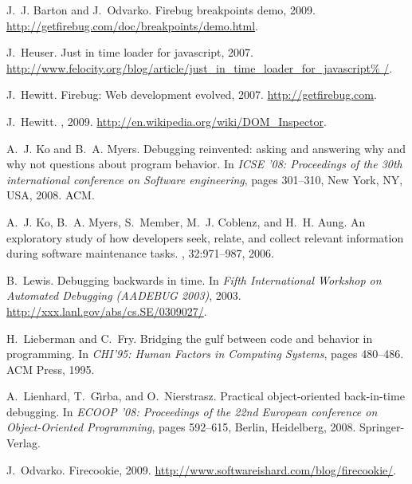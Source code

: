 \documentclass{www2010-accepted}
\begin{document}
\begin{thebibliography}{10}

J.~J. Barton and J.~Odvarko.
\newblock Firebug breakpoints demo, 2009.
\newblock \url{http://getfirebug.com/doc/breakpoints/demo.html}.

J.~Heuser.
\newblock Just in time loader for javascript, 2007.
\newblock
  \url{http://www.felocity.org/blog/article/just_in_time_loader_for_javascript%
/}.

J.~Hewitt.
\newblock Firebug: Web development evolved, 2007.
\newblock \url{http://getfirebug.com}.

J.~Hewitt.
, 2009.
\newblock \url{http://en.wikipedia.org/wiki/DOM_Inspector}.

A.~J. Ko and B.~A. Myers.
\newblock Debugging reinvented: asking and answering why and why not questions
  about program behavior.
\newblock In {\em ICSE '08: Proceedings of the 30th international conference on
  Software engineering}, pages 301--310, New York, NY, USA, 2008. ACM.

A.~J. Ko, B.~A. Myers, S.~Member, M.~J. Coblenz, and H.~H. Aung.
\newblock An exploratory study of how developers seek, relate, and collect
  relevant information during software maintenance tasks.
, 32:971--987, 2006.

B.~Lewis.
\newblock Debugging backwards in time.
\newblock In {\em Fifth International Workshop on Automated Debugging (AADEBUG
  2003)}, 2003.
\newblock \url{http://xxx.lanl.gov/abs/cs.SE/0309027/}.

H.~Lieberman and C.~Fry.
\newblock Bridging the gulf between code and behavior in programming.
\newblock In {\em CHI'95: Human Factors in Computing Systems}, pages 480--486.
  ACM Press, 1995.

A.~Lienhard, T.~G\^{\i}rba, and O.~Nierstrasz.
\newblock Practical object-oriented back-in-time debugging.
\newblock In {\em ECOOP '08: Proceedings of the 22nd European conference on
  Object-Oriented Programming}, pages 592--615, Berlin, Heidelberg, 2008.
  Springer-Verlag.

J.~Odvarko.
\newblock Firecookie, 2009.
\newblock \url{http://www.softwareishard.com/blog/firecookie/}.


\end{thebibliography}
\end{document}
